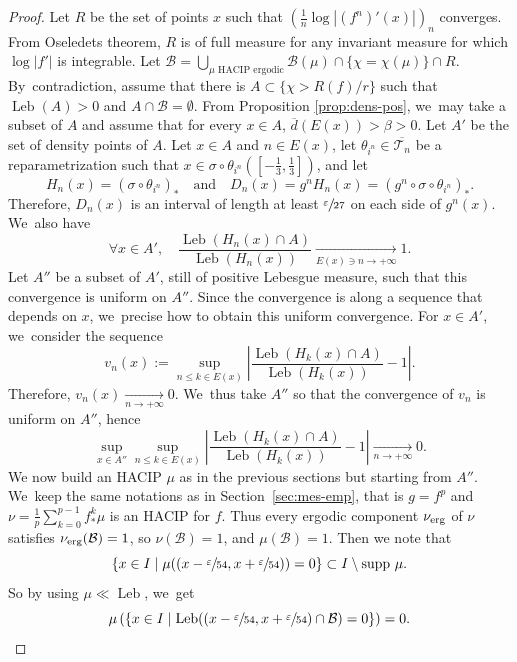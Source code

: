 \documentclass[10pt]{amsart}
\newcommand{\erg}{\textup{erg}}
\DeclareMathOperator{\Leb}{Leb}
\theoremstyle{definition}
\begin{document}
\begin{proof}
Let $R$ be the set of points $x$ such that $\left(\frac{1}{n} \log |(f^n)'(x)| \right)_n$ converges.
From Oseledets theorem, $R$ is of full measure for any invariant measure for which $\log |f'|$ is integrable.
Let $\mathcal{B} = \bigcup_{\mu \text{ HACIP ergodic}} \mathcal{B}(\mu) \cap \{ \chi = \chi(\mu) \} \cap R$. By~contradiction, assume that there is $A \subset \{ \chi > R(f)/r \}$ such that $\Leb(A) > 0$ and $A \cap \mathcal{B} = \emptyset$.
From Proposition \ref{prop:dens-pos}, we~may take a subset of $A$ and assume that for every $x \in A$, $\overline{d}(E(x)) > \beta > 0$.
Let $A'$ be the set of density points of $A$.
Let $x \in A$ and $n \in E(x)$, let $\theta_{i^n} \in \overline{\mathcal{T}_n}$ be a reparametrization such that $x \in \sigma \circ \theta_{i^n} \left (\left [ - \frac{1}{3}, \frac{1}{3} \right ] \right)$, and let
\[
H_n(x) = \left (\sigma \circ \theta_{i^n} \right)_* \quad \text{and} \quad D_n(x) = g^n H_n(x) = \left (g^n \circ \sigma \circ \theta_{i^n} \right)_*.
\]
Therefore, $D_n(x)$ is an interval of length at least $\sfrac{\varepsilon}{27}$ on each side of $g^n(x)$. We~also have
\[
\forall x \in A',\quad \frac{\Leb(H_n(x) \cap A)}{\Leb(H_n(x))} \underset{E(x) \ni n \to +\infty}{\longrightarrow} 1.
\]
Let $A''$ be a subset of $A'$, still of positive Lebesgue measure, such that this convergence is uniform on $A''$.
Since the convergence is along a sequence that depends on $x$, we~precise how to obtain this uniform convergence.
For $x \in A'$, we~consider the sequence
\[
v_n(x) := \sup_{n \leq k \in E(x)} \left | \frac{\Leb(H_k(x) \cap A)}{\Leb(H_k(x))} - 1 \right |.
\]
Therefore, $v_n(x) \underset{n \to +\infty}{\longrightarrow} 0$. We~thus take $A''$ so that the convergence of $v_n$ is uniform on $A''$, hence
\[
\sup_{x \in A''} \sup_{n \leq k \in E(x)} \left | \frac{\Leb(H_k(x) \cap A)}{\Leb(H_k(x))} - 1 \right | \underset{n \to +\infty}{\longrightarrow} 0.
\]
We now build an HACIP $\mu$ as in the previous sections but starting from $A''$. We~keep the same notations as in Section~\ref{sec:mes-emp}, that is $g=f^p$ and $\nu = \frac{1}{p} \sum_{k=0}^{p-1} f^k_* \mu$ is an HACIP for $f$.
Thus every ergodic component $\nu_{\erg}$ of $\nu$ satisfies $\nu_{\erg}(\mathcal{B}) = 1$, so $\nu(\mathcal{B})=1$, and $\mu(\mathcal{B}) = 1$.
Then we note that
\[
\{ x \in I \mid \mu((x - \sfrac{\varepsilon}{54}, x + \sfrac{\varepsilon}{54})) = 0 \} \subset I \setminus \text{supp } \mu.
\]
So by using $\mu \ll \Leb$, we~get
\[
\mu \left (\{ x \in I \mid \Leb((x - \sfrac{\varepsilon}{54}, x + \sfrac{\varepsilon}{54}) \cap \mathcal{B}) = 0 \} \right) = 0.
\]
\end{proof}
\end{document}
